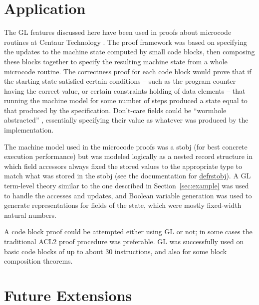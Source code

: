 \documentclass[submission,copyright,creativecommons]{eptcs}
\begin{document}
\section{Application}
\label{sec:applications}

The GL features discussed here have been used in proofs about
microcode routines at Centaur Technology \cite{davis2014microcode}.
The proof framework was based on specifying the updates to the machine
state computed by small code blocks, then composing these blocks
together to specify the resulting machine state from a whole microcode
routine.  The correctness proof for each code block would prove that
if the starting state satisfied certain conditions -- such as the
program counter having the correct value, or certain constraints
holding of data elements -- that running the machine model for some
number of steps produced a state equal to that produced by the
specification.  Don't-care fields could be ``wormhole abstracted''
\cite{hardinucode}, essentially specifying their value as whatever was
produced by the implementation.

The machine model used in the microcode proofs was a stobj (for best
concrete execution performance) but was modeled logically as a nested
record structure in which field accessors always fixed the stored
values to the appropriate type to match what was stored in the stobj
(see the documentation for
\href{http://www.cs.utexas.edu/users/moore/acl2/manuals/current/manual/?topic=ACL2____DEFRSTOBJ}{\underline{defrstobj}}).
A GL term-level theory similar to the one described in
Section~\ref{sec:example} was used to handle the accesses and updates,
and Boolean variable generation was used to generate representations
for fields of the state, which were mostly fixed-width natural
numbers.

A code block proof could be attempted either using GL or not; in some
cases the traditional ACL2 proof procedure was preferable.  GL was
successfully used on basic code blocks of up to about 30 instructions,
and also for some block composition theorems.


\section{Future Extensions}
\label{sec:future}
\end{document}
